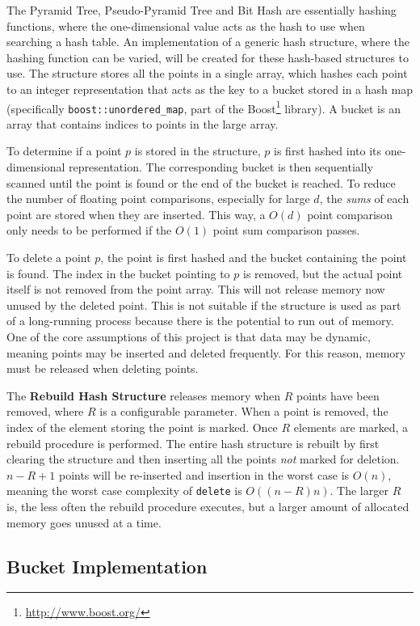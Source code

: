 The Pyramid Tree, Pseudo-Pyramid Tree and Bit Hash are essentially hashing functions, where the one-dimensional value acts as the hash to use when searching a hash table.
An implementation of a generic hash structure, where the hashing function can be varied, will be created for these hash-based structures to use. The structure stores all the points in a single array, which hashes each point to an integer representation that acts as the key to a bucket stored in a hash map (specifically \texttt{boost::unordered\_map}, part of the Boost\footnote{\url{http://www.boost.org/}} library). A bucket is an array that contains indices to points in the large array.

To determine if a point $p$ is stored in the structure, $p$ is first hashed into its one-dimensional representation. The corresponding bucket is then sequentially scanned until the point is found or the end of the bucket is reached. To reduce the number of floating point comparisons, especially for large $d$, the \textit{sums} of each point are stored when they are inserted. This way, a $O(d)$ point comparison only needs to be performed if the $O(1)$ point sum comparison passes.

To delete a point $p$, the point is first hashed and the bucket containing the point is found. The index in the bucket pointing to $p$ is removed, but the actual point itself is not removed from the point array. This will not release memory now unused by the deleted point. This is not suitable if the structure is used as part of a long-running process because there is the potential to run out of memory. One of the core assumptions of this project is that data may be dynamic, meaning points may be inserted and deleted frequently. For this reason, memory must be released when deleting points.

The \textbf{Rebuild Hash Structure} releases memory when $R$ points have been removed, where $R$ is a configurable parameter. When a point is removed, the index of the element storing the point is marked. Once $R$ elements are marked, a rebuild procedure is performed. The entire hash structure is rebuilt by first clearing the structure and then inserting all the points \textit{not} marked for deletion. $n - R + 1$ points will be re-inserted and insertion in the worst case is $O(n)$, meaning the worst case complexity of \texttt{delete} is $O((n - R)n)$. The larger $R$ is, the less often the rebuild procedure executes, but a larger amount of allocated memory goes unused at a time.

\subsection{Bucket Implementation}

